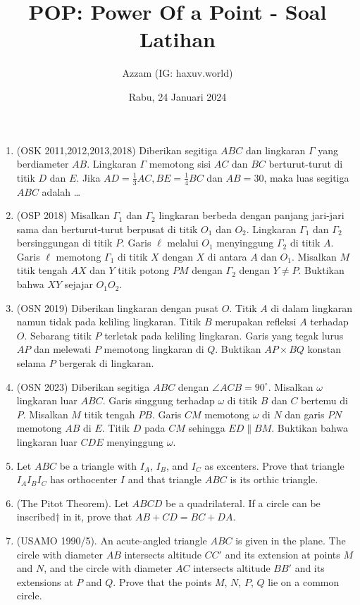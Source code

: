 \documentclass[11pt]{scrartcl}
\title{POP: Power Of a Point - Soal Latihan}
\author{Azzam (IG: haxuv.world)}
\date{Rabu, 24 Januari 2024}
\begin{document}
\maketitle
\begin{enumerate}
    \item (OSK 2011,2012,2013,2018) Diberikan segitiga $ABC$ dan lingkaran $\Gamma$ yang berdiameter $AB$. Lingkaran $\Gamma$ memotong sisi $AC$ dan $BC$ berturut-turut di titik $D$ dan $E$. Jika $AD = \frac13 AC, BE =\frac14 BC$ dan $AB = 30$, maka luas segitiga $ABC$ adalah \dots

    \item (OSP 2018) Misalkan $\Gamma_1$ dan $\Gamma_2$ lingkaran berbeda dengan panjang jari-jari sama dan berturut-turut berpusat di titik $O_1$ dan $O_2$. Lingkaran $\Gamma_1$ dan $\Gamma_2$ bersinggungan di titik $P$. Garis $\ell$ melalui $O_1$ menyinggung $\Gamma_2$ di titik $A$. Garis $\ell$ memotong $\Gamma_1$ di titik $X$ dengan $X$ di antara $A$ dan $O_1$. Misalkan $M$ titik tengah $AX$ dan $Y$ titik potong $PM$ dengan $\Gamma_2$ dengan $Y \neq P$. Buktikan bahwa $XY$ sejajar $O_1O_2$.
    
    \item (OSN 2019) Diberikan lingkaran dengan pusat $O$. Titik $A$ di dalam lingkaran namun tidak pada keliling lingkaran. Titik $B$ merupakan refleksi $A$ terhadap $O$. Sebarang titik $P$ terletak pada keliling lingkaran. Garis yang tegak lurus $AP$ dan melewati $P$ memotong lingkaran di $Q$. Buktikan $AP \times BQ$ konstan selama $P$ bergerak di lingkaran.
    
    \item (OSN 2023) Diberikan segitiga $ABC$ dengan $\angle ACB = 90^\circ$. Misalkan $\omega$ lingkaran luar $ABC$. Garis singgung terhadap $\omega$ di titik $B$ dan $C$ bertemu di $P$. Misalkan $M$ titik tengah $PB$. Garis $CM$ memotong $\omega$ di $N$ dan garis $PN$ memotong $AB$ di $E$. Titik $D$ pada $CM$ sehingga $ED \parallel BM$. Buktikan bahwa lingkaran luar $CDE$ menyinggung $\omega$.

    \item Let $ABC$ be a triangle with $I_A$, $I_B$, and $I_C$ as excenters. Prove that triangle $I_AI_BI_C$ has orthocenter $I$ and that triangle $ABC$ is its orthic triangle.
    
    \item (The Pitot Theorem). Let $ABCD$ be a quadrilateral. If a circle can be inscribed† in it, prove that $AB + CD = BC + DA$.
    
    \item (USAMO 1990/5). An acute-angled triangle $ABC$ is given in the plane. The circle with diameter $AB$ intersects altitude $CC'$ and its extension at points $M$ and $N$, and the circle with diameter $AC$ intersects altitude $BB'$ and its extensions at $P$ and $Q$. Prove that the points $M$, $N$, $P$, $Q$ lie on a common circle.
    

\end{enumerate}
\end{document}
